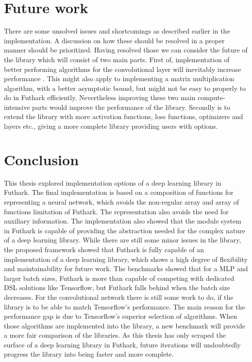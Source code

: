 \label{conclusion}
\section{Future work}
There are some unsolved issues and shortcomings as described earlier in the
implementation. 
A discussion on how these should be resolved in a proper manner should be
prioritized. 
Having resolved those we can consider the future of the library which will
consist of two main parts. 
First of, implementation of better performing algorithms for the convolutional
layer will inevitably increase performance \cite{Performance}. 
This might also apply to implementing a matrix multiplication algorithm, with a
better asymptotic bound, but might not be easy to properly to do in Futhark
efficiently. Nevertheless improving these two main compute-intensive parts would
improve the performance of the library. 
Secondly is to extend the library with more activation functions, loss
functions, optimizers and layers etc., giving a more complete library providing
users with options. 

\section{Conclusion} 
This thesis explored implementation options of a deep learning library in
Futhark. 
The final implementation is based on a composition of functions for representing
a neural network, which avoids the non-regular array and array of functions
limitation of Futhark. 
The representation also avoids the need for auxiliary information.  
The implementation also showed that the module system in Futhark is capable of
providing the abstraction needed for the complex nature of a deep learning
library.
While there are still some minor issues in the library, the proposed framework
showed that Futhark is fully capable of an implementation of a deep learning
library, which shows a high degree of flexibility and maintainability for future
work.  \newline \newline 
The benchmarks showed that for a MLP and larger batch sizes, Futhark is more
than capable of competing with dedicated DSL solutions like Tensorflow, but
Futhark falls behind when the batch size decreases. 
For the convolutional network there is still some work to do, if the library is
to be able to match Tensorflow's performance. 
The main reason for the performance gap is due to Tensorflow's superior
selection of algorithms. 
When those algorithms are implemented into the library, a new benchmark will
provide a more fair comparison of the  libraries. 
As this thesis has only scraped the surface of a deep learning library in
Futhark, future iterations will undoubtedly progress the library into being
faster and more complete.

